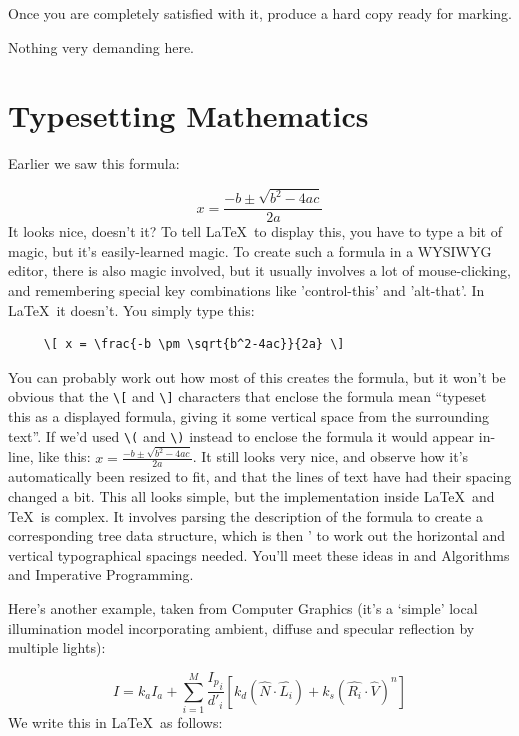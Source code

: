 \begin{refsection}
Once you are completely satisfied with it, produce a hard copy ready for marking.

\begin{demonote}
  Nothing very demanding here.
\end{demonote}

\section{Typesetting Mathematics}
\label{mathssection}

Earlier we saw this formula:

\[ x = \frac{-b \pm \sqrt{b^2-4ac}}{2a} \]
It looks nice, doesn't it? To tell \LaTeX\ to display this, you have to type a bit of magic, but it's easily-learned magic. To create such a formula in a WYSIWYG editor, there is also magic involved, but it usually involves a lot of mouse-clicking, and remembering special key combinations like 'control-this' and 'alt-that'. In \LaTeX\ it doesn't. You simply type this:
\begin{verbatim}
     \[ x = \frac{-b \pm \sqrt{b^2-4ac}}{2a} \]
\end{verbatim}
You can probably work out how most of this creates the formula, but it won't be obvious that the \verb|\[| and  \verb|\]| characters that enclose the formula mean ``typeset this as a displayed formula, giving it some vertical space from the surrounding text''. If we'd used \verb|\(| and \verb|\)| instead to enclose the formula it would appear in-line, like this: \(  x = \frac{-b \pm \sqrt{b^2-4ac}}{2a} \). It still looks very nice, and observe how it's automatically been resized to fit, and that the lines of text have had their spacing changed a bit. This all looks simple, but the implementation inside \LaTeX\ and \TeX\ is complex. It involves parsing the description of the formula to create a corresponding tree data structure, which is then ' to work out the horizontal and vertical typographical spacings needed. You'll meet these ideas in  and  Algorithms and Imperative Programming.

Here's another example, taken from  Computer Graphics (it's a `simple' local illumination model incorporating ambient, diffuse and specular reflection by multiple lights):

\[ I = k_a I_a + \sum_{i=1}^M {\frac{{I_p}_i}{d'_i}} [ k_d(\hat{N}\cdot\hat{L_i}) + k_s(\hat{R_i}\cdot\hat{V})^n] \]
%
We write this in \LaTeX\ as follows:


\end{refsection}
